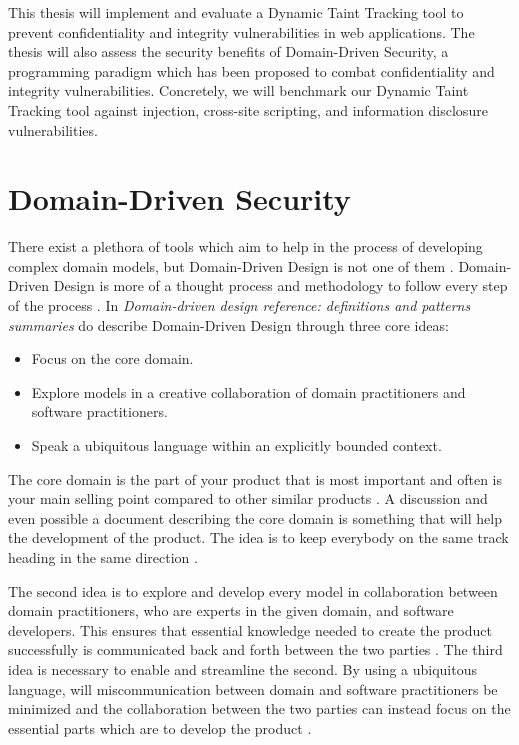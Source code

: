 This thesis will implement and evaluate a Dynamic Taint Tracking tool to prevent confidentiality and integrity vulnerabilities in web applications. The thesis will also assess the security benefits of Domain-Driven Security, a programming paradigm which has been proposed to combat confidentiality and integrity vulnerabilities. Concretely, we will benchmark our Dynamic Taint Tracking tool against injection, cross-site scripting, and information disclosure vulnerabilities.


\section{Domain-Driven Security}
\label{DomainDrivenSecurity}
There exist a plethora of tools which aim to help in the process of developing complex domain models, but Domain-Driven Design is not one of them \parencite{Bankes, 10.1007/978-3-319-24309-2_33}. Domain-Driven Design is more of a thought process and methodology to follow every step of the process \parencite{EvansEric2004Dd:t}. In \emph{Domain-driven design reference: definitions and patterns summaries} do \textcite{evans_2015} describe Domain-Driven Design through three core ideas:

\begin{itemize}
    \item Focus on the core domain.
    \item Explore models in a creative collaboration of domain practitioners and software practitioners.
    \item Speak a ubiquitous language within an explicitly bounded context.
\end{itemize}

The core domain is the part of your product that is most important and often is your main selling point compared to other similar products \parencite{millett_2015}. A discussion and even possible a document describing the core domain is something that will help the development of the product. The idea is to keep everybody on the same track heading in the same direction \parencite{EvansEric2004Dd:t}.

The second idea is to explore and develop every model in collaboration between domain practitioners, who are experts in the given domain, and software developers. This ensures that essential knowledge needed to create the product successfully is communicated back and forth between the two parties \parencite{millett_2015}. The third idea is necessary to enable and streamline the second. By using a ubiquitous language, will miscommunication between domain and software practitioners be minimized and the collaboration between the two parties can instead focus on the essential parts which are to develop the product \parencite{evans_2015}.

